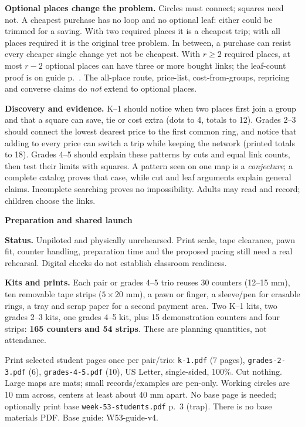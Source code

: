 \documentclass[11pt]{article}
\newcommand{\head}[1]{\par{\large\bfseries #1}\par\nobreak}
\begin{document}
\textbf{Optional places change the problem.} Circles must connect; squares need not. A cheapest purchase has no loop and no optional leaf: either could be trimmed for a saving. With two required places it is a cheapest trip; with all places required it is the original tree problem. In between, a purchase can resist every cheaper single change yet not be cheapest. With $r\ge2$ required places, at most $r-2$ optional places can have three or more bought links; the leaf-count proof is on guide p.~\pageref{leaf}. The all-place route, price-list, cost-from-groups, repricing and converse claims do \emph{not} extend to optional places.

\textbf{Discovery and evidence.} K--1 should notice when two places first join a group and that a square can save, tie or cost extra (dots to 4, totals to 12). Grades 2--3 should connect the lowest dearest price to the first common ring, and notice that adding to every price can switch a trip while keeping the network (printed totals to 18). Grades 4--5 should explain these patterns by cuts and equal link counts, then test their limits with squares. A pattern seen on one map is a \emph{conjecture}; a complete catalog proves that case, while cut and leaf arguments explain general claims. Incomplete searching proves no impossibility. Adults may read and record; children choose the links.
\newpage
\head{Preparation and shared launch}
\textbf{Status.} Unpiloted and physically unrehearsed. Print scale, tape clearance, pawn fit, counter handling, preparation time and the proposed pacing still need a real rehearsal. Digital checks do not establish classroom readiness.

\textbf{Kits and prints.} Each pair or grades 4--5 trio reuses 30 counters (12--15 mm), ten removable tape strips ($5\times20$ mm), a pawn or finger, a sleeve/pen for erasable rings, a tray and scrap paper for a second payment area. Two K--1 kits, two grades 2--3 kits, one grades 4--5 kit, plus 15 demonstration counters and four strips: \textbf{165 counters and 54 strips}. These are planning quantities, not attendance.

Print selected student pages once per pair/trio: \texttt{k-1.pdf} (7 pages), \texttt{grades-2-3.pdf} (6), \texttt{grades-4-5.pdf} (10), US Letter, single-sided, 100\%. Cut nothing. Large maps are mats; small records/examples are pen-only. Working circles are 10 mm across, centers at least about 40 mm apart. No base page is needed; optionally print base \texttt{week-53-students.pdf} p.~3 (trap). There is no base materials PDF. Base guide: W53-guide-v4.
\end{document}
